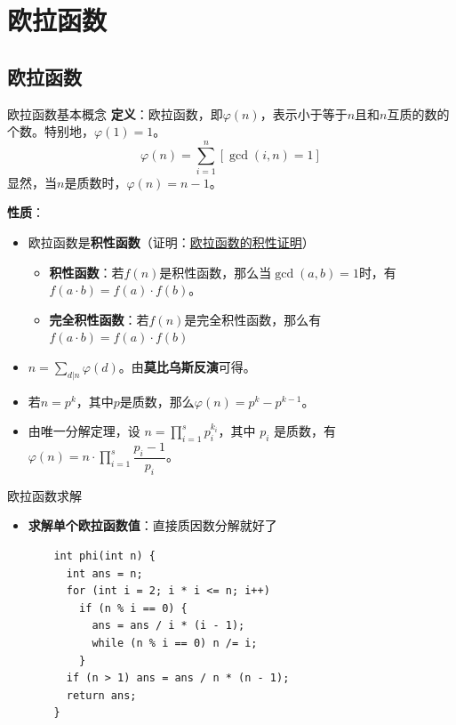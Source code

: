 \section{欧拉函数}
\subsection{欧拉函数}
\begin{frame}[fragile]{欧拉函数}{基本概念}
  \textbf{定义}：欧拉函数，即$\varphi(n)$，表示小于等于$n$且和$n$互质的数的个数。特别地，$\varphi(1)=1$。
  $$
  \varphi(n) = \sum\limits_{i=1}^{n} [\gcd(i, n)=1]
  $$
  显然，当$n$是质数时，$\varphi(n)=n-1$。
  \vspace{0.3cm}
  \pause

  \textbf{性质}：
  \begin{itemize}
    \item 欧拉函数是\textbf{积性函数}（证明：\href{https://xdbirdie.github.io/2020/07/07/%E6%AC%A7%E6%8B%89%E5%87%BD%E6%95%B0/}{欧拉函数的积性证明}）
    \begin{itemize}
      \item \textbf{积性函数}：若$f(n)$是积性函数，那么当$\gcd(a,b)=1$时，有$f(a\cdot b)=f(a)\cdot f(b)$。
      \item \textbf{完全积性函数}：若$f(n)$是完全积性函数，那么有$f(a\cdot b)=f(a)\cdot f(b)$
    \end{itemize}
    \pause
    \item $n = \sum_{d|n}\varphi(d)$。由\textbf{莫比乌斯反演}可得。
    \pause
    \item 若$n=p^k$，其中$p$是质数，那么$\varphi(n)=p^k - p^{k-1}$。
    \item 由唯一分解定理，设 $n = \prod\limits_{i=1}^{s}p_i^{k_i}$，其中 $p_i$ 是质数，有 $\varphi(n) = n \cdot \prod\limits_{i = 1}^s{\dfrac{p_i - 1}{p_i}}$。
  \end{itemize}
\end{frame}

\begin{frame}[fragile]{欧拉函数}{求解}
  \begin{itemize}
    \item \textbf{求解单个欧拉函数值}：直接质因数分解就好了
    \begin{lstlisting}
    int phi(int n) {
      int ans = n;
      for (int i = 2; i * i <= n; i++)
        if (n % i == 0) {
          ans = ans / i * (i - 1);
          while (n % i == 0) n /= i;
        }
      if (n > 1) ans = ans / n * (n - 1);
      return ans;
    }
    \end{lstlisting}
  \end{itemize}
\end{frame}

